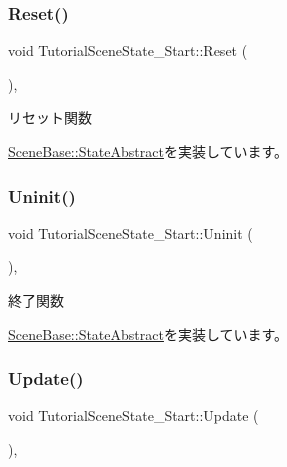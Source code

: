 \subsubsection{\texorpdfstring{Reset()}{Reset()}}
{\footnotesize\ttfamily void Tutorial\+Scene\+State\+\_\+\+Start\+::\+Reset (\begin{DoxyParamCaption}{ }\end{DoxyParamCaption})\hspace{0.3cm}{\ttfamily [override]}, {\ttfamily [virtual]}}



リセット関数 



\mbox{\hyperlink{class_scene_base_1_1_state_abstract_a7e00d36fa023d91a0f205f12662584a0}{Scene\+Base\+::\+State\+Abstract}}を実装しています。

\mbox{\label{class_tutorial_scene_state___start_a974962addfb0bcba90fbab64ac6d50f0}} 
\subsubsection{\texorpdfstring{Uninit()}{Uninit()}}
{\footnotesize\ttfamily void Tutorial\+Scene\+State\+\_\+\+Start\+::\+Uninit (\begin{DoxyParamCaption}{ }\end{DoxyParamCaption})\hspace{0.3cm}{\ttfamily [override]}, {\ttfamily [virtual]}}



終了関数 



\mbox{\hyperlink{class_scene_base_1_1_state_abstract_a7a92fbd3fd68177a4e807bf7c359641c}{Scene\+Base\+::\+State\+Abstract}}を実装しています。

\mbox{\label{class_tutorial_scene_state___start_a93c322692bf56172f383d3e5b17cd85c}} 
\subsubsection{\texorpdfstring{Update()}{Update()}}
{\footnotesize\ttfamily void Tutorial\+Scene\+State\+\_\+\+Start\+::\+Update (\begin{DoxyParamCaption}{ }\end{DoxyParamCaption})\hspace{0.3cm}{\ttfamily [override]}, {\ttfamily [virtual]}}



